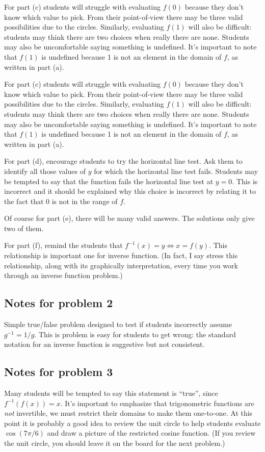 \documentclass[nooutcomes]{ximera}
\begin{document}
For part (c) students will struggle with evaluating $f(0)$ because they don't know which value to pick.
From their point-of-view there may be three valid possibilities due to the circles.
Similarly, evaluating $f(1)$ will also be difficult: students may think there are two choices when really there are none.
Students may also be uncomfortable saying something is undefined.
It's important to note that $f(1)$ is undefined because 1 is not an element in the domain of $f$, as written in part (a).

For part (c) students will struggle with evaluating $f(0)$ because they don't know which value to pick.
From their point-of-view there may be three valid possibilities due to the circles.
Similarly, evaluating $f(1)$ will also be difficult: students may think there are two choices when really there are none.
Students may also be uncomfortable saying something is undefined.
It's important to note that $f(1)$ is undefined because 1 is not an element in the domain of $f$, as written in part (a).

For part (d), encourage students to try the horizontal line test.
Ask them to identify all those values of $y$ for which the horizontal line test fails.
Students may be tempted to say that the function fails the horizontal line test at $y = 0$.
This is incorrect and it should be explained why this choice is incorrect by relating it to the fact that 0 is not in the range of $f$.

Of course for part (e), there will be many valid answers.
The solutions only give two of them.

For part (f), remind the students that $f^{-1}(x) = y \iff x = f(y)$.
This relationship is important one for inverse function.
(In fact, I say stress this relationship, along with its graphically interpretation, every time you work through an inverse function problem.)

\subsection*{Notes for problem 2}
Simple true/false problem designed to test if students incorrectly assume $g^{-1} = 1/g$.
This is problem is easy for students to get wrong: the standard notation for an inverse function is suggestive but not consistent. 

\subsection*{Notes for problem 3}
Many students will be tempted to say this statement is ``true'', since $f^{-1}(f(x)) = x$.
It's important to emphasize that trigonometric functions are \emph{not} invertible, we must restrict their domains to make them one-to-one.
At this point it is probably a good idea to review the unit circle to help students evaluate $\cos(7\pi/6)$ and draw a picture of the restricted cosine function.
(If you review the unit circle, you should leave it on the board for the next problem.)
\end{document}
